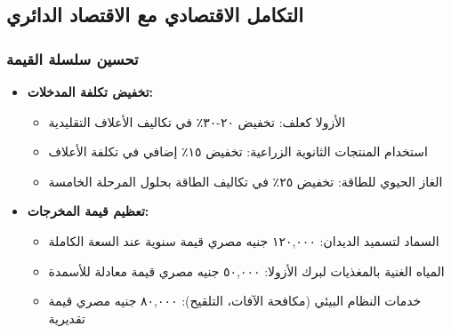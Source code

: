 \subsection{التكامل الاقتصادي مع الاقتصاد الدائري}

\subsubsection{تحسين سلسلة القيمة}
\begin{itemize}
    \item \textbf{تخفيض تكلفة المدخلات:}
    \begin{itemize}
        \item الأزولا كعلف: تخفيض ٢٠-٣٠٪ في تكاليف الأعلاف التقليدية
        \item استخدام المنتجات الثانوية الزراعية: تخفيض ١٥٪ إضافي في تكلفة الأعلاف
        \item الغاز الحيوي للطاقة: تخفيض ٢٥٪ في تكاليف الطاقة بحلول المرحلة الخامسة
    \end{itemize}
    
    \item \textbf{تعظيم قيمة المخرجات:}
    \begin{itemize}
        \item السماد لتسميد الديدان: ١٢٠,٠٠٠ جنيه مصري قيمة سنوية عند السعة الكاملة
        \item المياه الغنية بالمغذيات لبرك الأزولا: ٥٠,٠٠٠ جنيه مصري قيمة معادلة للأسمدة
        \item خدمات النظام البيئي (مكافحة الآفات، التلقيح): ٨٠,٠٠٠ جنيه مصري قيمة تقديرية
    \end{itemize}
\end{itemize}

